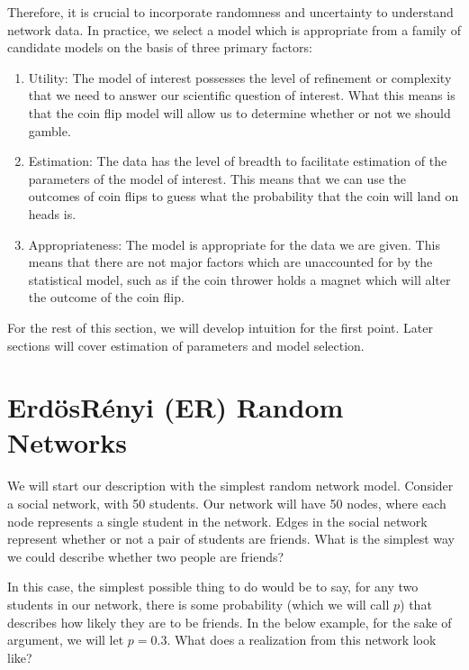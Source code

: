 \documentclass[letterpaper,10pt,english]{jupyterBook}
\begin{document}
\sphinxAtStartPar
Therefore, it is crucial to incorporate randomness and uncertainty to understand network data. In practice, we select a model which is appropriate from a family of candidate models on the basis of three primary factors:
\begin{enumerate}
%
\item {} 
\sphinxAtStartPar
Utility: The model of interest possesses the level of refinement or complexity that we need to answer our scientific question of interest. What this means is that the coin flip model will allow us to determine whether or not we should gamble.

\item {} 
\sphinxAtStartPar
Estimation: The data has the level of breadth to facilitate estimation of the parameters of the model of interest. This means that we can use the outcomes of coin flips to guess what the probability that the coin will land on heads is.

\item {} 
\sphinxAtStartPar
Appropriateness: The model is appropriate for the data we are given. This means that there are not major factors which are unaccounted for by the statistical model, such as if the coin thrower holds a magnet which will alter the outcome of the coin flip.

\end{enumerate}

\sphinxAtStartPar
For the rest of this section, we will develop intuition for the first point. Later sections will cover estimation of parameters and model selection.


\section{Erdös\sphinxhyphen{}Rényi (ER) Random Networks}
\label{\detokenize{representations/ch5/single-network-models_ER:erdos-renyi-er-random-networks}}\label{\detokenize{representations/ch5/single-network-models_ER::doc}}
\sphinxAtStartPar
We will start our description with the simplest random network model. Consider a social network, with 50 students. Our network will have 50 nodes, where each node represents a single student in the network. Edges in the social network represent whether or not a pair of students are friends. What is the simplest way we could describe whether two people are friends?

\sphinxAtStartPar
In this case, the simplest possible thing to do would be to say, for any two students in our network, there is some probability (which we will call \(p\)) that describes how likely they are to be friends. In the below example, for the sake of argument, we will let \(p=0.3\). What does a realization from this network look like?
\end{document}
